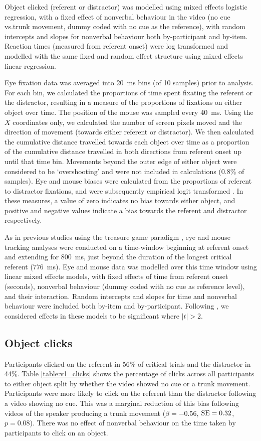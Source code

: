 \documentclass[a4paper,man,natbib]{apa6}
\newcommand{\resultsLog}[3]{$\beta = #1$, $\textnormal{SE} = #2$, $p #3$}
\begin{document}
Object clicked (referent or distractor) was modelled using mixed effects logistic regression, with a fixed effect of nonverbal behaviour in the video (no cue vs.\@ trunk movement, dummy coded with no cue as the reference), with random intercepts and slopes for nonverbal behaviour both by-participant and by-item.
Reaction times (measured from referent onset) were log transformed and modelled with the same fixed and random effect structure using mixed effects linear regression.

Eye fixation data was averaged into 20~ms bins (of 10 samples) prior to analysis.
For each bin, we calculated the proportions of time spent fixating the referent or the distractor, resulting in a measure of the proportions of fixations on either object over time.
The position of the mouse was sampled every 40~ms.
Using the $X$ coordinates only, we calculated the number of screen pixels moved and the direction of movement (towards either referent or distractor).
We then calculated the cumulative distance travelled towards each object over time as a proportion of the cumulative distance travelled in both directions from referent onset up until that time bin.
Movements beyond the outer edge of either object were considered to be `overshooting' and were not included in calculations (0.8\% of samples).
Eye  and mouse  biases were calculated from the proportions of referent to distractor fixations, and were subsequently empirical logit transformed \citep{Barr2008}. 
In these measures, a value of zero indicates no bias towards either object, and positive and negative values indicate a bias towards the referent and distractor respectively.

As in previous studies using the treasure game paradigm \citep{King2018,Loy2017}, eye  and mouse  tracking analyses were conducted on a time-window beginning at referent onset and extending for 800~ms, just beyond the duration of the longest critical referent (776~ms).
Eye and mouse data was modelled over this time window using linear mixed effects models, with fixed effects of time from referent onset (seconds), nonverbal behaviour (dummy coded with no cue as reference level), and their interaction.
Random intercepts and slopes for time and nonverbal behaviour were included both by-item and by-participant.
Following \citet{Baayen2008}, we considered effects in these models to be significant where $|t|>2$.

\subsection{Object clicks}
Participants clicked on the referent in 56\% of critical trials and the distractor in 44\%.
Table \ref{table:v1_clicks} shows the percentage of clicks across all participants to either object split by whether the video showed no cue or a trunk movement.
Participants were more likely to click on the referent than the distractor following a video showing no cue. 
This was a marginal reduction of this bias following videos of the speaker producing a trunk movement (\resultsLog{-0.56}{0.32}{=0.08}).
There was no effect of nonverbal behaviour on the time taken by participants to click on an object.
\end{document}
